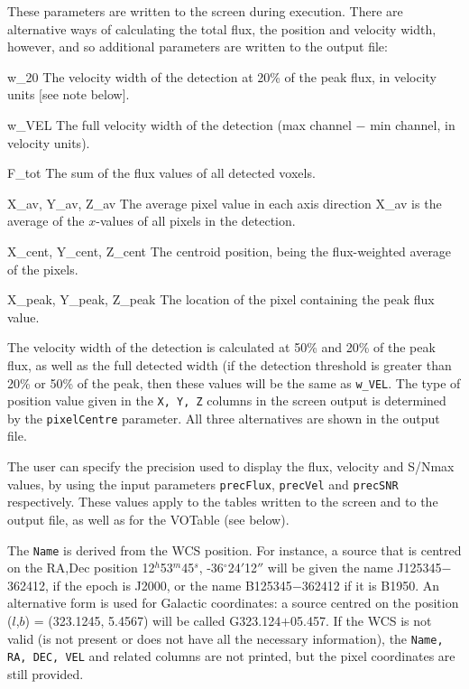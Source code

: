 These parameters are written to the screen during execution. There are
alternative ways of calculating the total flux, the position and
velocity width, however, and so additional parameters are written to
the output file:
\begin{Lentry}
\item[{w\_20}] The velocity width of the detection at 20\% of the peak
  flux, in velocity units [see note below].
\item[{w\_VEL}] The full velocity width of the detection (max channel
  $-$ min channel, in velocity units).
\item[{F\_tot}] The sum of the flux values of all detected voxels.
\item[{X\_av, Y\_av, Z\_av}] The average pixel value in each
  axis direction \ie X\_av is the average of the $x$-values of all
  pixels in the detection.
\item[{X\_cent, Y\_cent, Z\_cent}] The centroid position, being
  the flux-weighted average of the pixels.
\item[{X\_peak, Y\_peak, Z\_peak}] The location of the pixel
  containing the peak flux value.
\end{Lentry}
The velocity width of the detection is calculated at 50\% and 20\% of
the peak flux, as well as the full detected width (if the detection
threshold is greater than 20\% or 50\% of the peak, then these values
will be the same as \texttt{w\_VEL}. The type of position value given
in the \texttt{X, Y, Z} columns in the screen output is determined by
the \texttt{pixelCentre} parameter. All three alternatives are shown
in the output file.

The user can specify the precision used to display the flux, velocity
and S/Nmax values, by using the input parameters \texttt{precFlux},
\texttt{precVel} and \texttt{precSNR} respectively. These values apply
to the tables written to the screen and to the output file, as well as
for the VOTable (see below).

The \texttt{Name} is derived from the WCS position. For instance, a
source that is centred on the RA,Dec position 12$^h$53$^m$45$^s$,
-36$^\circ$24$'$12$''$ will be given the name J125345$-$362412, if the
epoch is J2000, or the name B125345$-$362412 if it is B1950. An
alternative form is used for Galactic coordinates: a source centred on
the position ($l$,$b$) = (323.1245, 5.4567) will be called
G323.124$+$05.457. If the WCS is not valid (\ie is not present or does
not have all the necessary information), the \texttt{Name, RA, DEC,
VEL} and related columns are not printed, but the pixel coordinates
are still provided.

